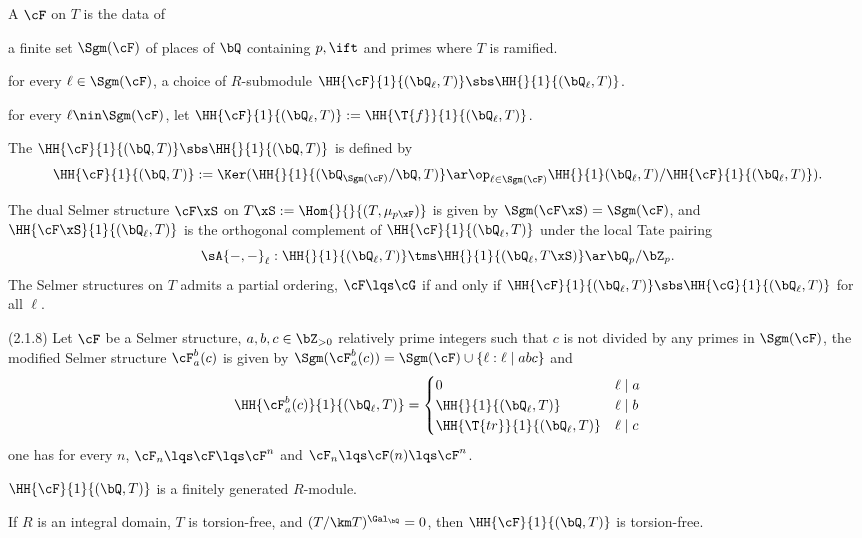 \documentclass[article, a4paper, twoside]{universal}
\begin{document}
\begin{dfn}[2.1.1, 2.3.1]
    A  $\cF$ on $T$ is the data of
    \begin{itm}
        \item a finite set $\Sgm(\cF)$ of places of $\bQ$ containing $p,\ift$ and primes where $T$ is ramified.
        \item for every $\ell\in\Sgm(\cF)$, a choice of $R$-submodule $\HH{\cF}{1}{(\bQ_{\ell},T)}\sbs\HH{}{1}{(\bQ_{\ell},T)}$.
        \item for every $\ell\nin\Sgm(\cF)$, let $\HH{\cF}{1}{(\bQ_{\ell},T)}:=\HH{\T{f}}{1}{(\bQ_{\ell},T)}$.
    \end{itm}
    The  $\HH{\cF}{1}{(\bQ,T)}\sbs\HH{}{1}{(\bQ,T)}$ is defined by
    \[
        \HH{\cF}{1}{(\bQ,T)}:=\Ker(\HH{}{1}{(\bQ_{\Sgm(\cF)}/\bQ,T)}\ar\op_{\ell\in\Sgm(\cF)}\HH{}{1}(\bQ_{\ell},T)/\HH{\cF}{1}{(\bQ_{\ell},T)}).
    \]
\end{dfn}

\begin{rmk}
    The dual Selmer structure $\cF\xS$ on $T\xS:=\Hom{}{}{(T,\mu_{p\xF})}$ is given by $\Sgm(\cF\xS)=\Sgm(\cF)$, and $\HH{\cF\xS}{1}{(\bQ_{\ell},T)}$ is the orthogonal complement of $\HH{\cF}{1}{(\bQ_{\ell},T)}$ under the local Tate pairing
    \[
        \sA{-,-}_{\ell}:\HH{}{1}{(\bQ_{\ell},T)}\tms\HH{}{1}{(\bQ_{\ell},T\xS)}\ar\bQ_{p}/\bZ_{p}.
    \]
    The Selmer structures on $T$ admits a partial ordering, $\cF\lqs \cG$ if and only if $\HH{\cF}{1}{(\bQ_{\ell},T)}\sbs\HH{\cG}{1}{(\bQ_{\ell},T)}$ for all $\ell$.

    (2.1.8) Let $\cF$ be a Selmer structure, $a,b,c\in\bZ_{>0}$ relatively prime integers such that $c$ is not divided by any primes in $\Sgm(\cF)$, the modified Selmer structure $\cF_{a}^{b}(c)$ is given by $\Sgm(\cF_{a}^{b}(c))=\Sgm(\cF)\cup\{\ell:\ell\mid abc\}$ and
    \[
        \HH{\cF_{a}^{b}(c)}{1}{(\bQ_{\ell},T)}=\begin{cases}
          0 & \ell \mid a \\
          \HH{}{1}{(\bQ_{\ell},T)} & \ell\mid b \\
          \HH{\T{tr}}{1}{(\bQ_{\ell},T)} & \ell\mid c
        \end{cases}
    \]
    one has for every $n$, $\cF_{n}\lqs\cF\lqs\cF^{n}$ and $\cF_{n}\lqs\cF(n)\lqs\cF^{n}$.
\end{rmk}

\begin{thm}[2.1.5]
    $\HH{\cF}{1}{(\bQ,T)}$ is a finitely generated $R$-module.

    If $R$ is an integral domain, $T$ is torsion-free, and $(T/\km T)^{\Gal_{\bQ}}=0$, then $\HH{\cF}{1}{(\bQ,T)}$ is torsion-free.
\end{thm}
\end{document}
